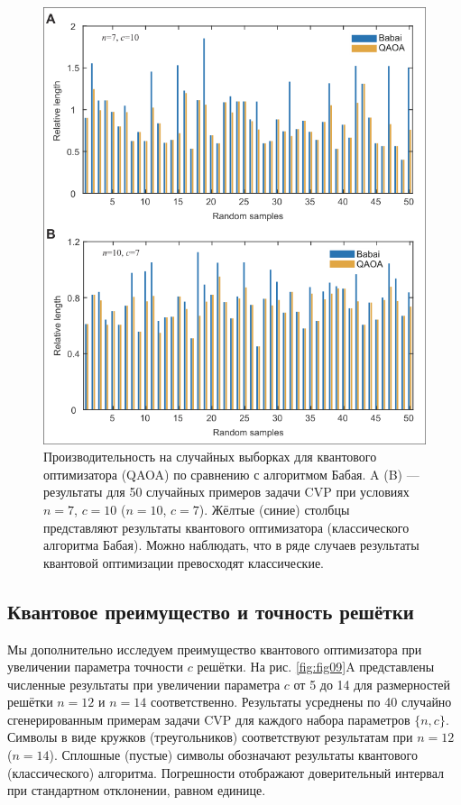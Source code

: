 \begin{figure}
    \centering
    \includegraphics[scale=0.6]{inc/fig_08.png}
    \caption{
    Производительность на случайных выборках для квантового оптимизатора (QAOA)
    по сравнению с алгоритмом Бабая. A (B) — результаты для 50 случайных
    примеров задачи CVP при условиях $n = 7$, $c = 10$ ($n = 10$, $c = 7$).
    Жёлтые (синие) столбцы представляют результаты квантового оптимизатора
    (классического алгоритма Бабая). Можно наблюдать, что в ряде случаев
    результаты квантовой оптимизации превосходят классические.
    }
    \label{fig:fig08}
\end{figure}

\subsection*{Квантовое преимущество и точность решётки}

Мы дополнительно исследуем преимущество квантового оптимизатора при увеличении
параметра точности $c$ решётки. На рис. \ref{fig:fig09}A представлены численные
результаты при увеличении параметра $c$ от 5 до 14 для размерностей решётки $n
= 12$ и $n = 14$ соответственно. Результаты усреднены по 40 случайно
сгенерированным примерам задачи CVP для каждого набора параметров $\{n, c\}$.
Символы в виде кружков (треугольников) соответствуют результатам при $n = 12$
($n = 14$). Сплошные (пустые) символы обозначают результаты квантового
(классического) алгоритма. Погрешности отображают доверительный интервал при
стандартном отклонении, равном единице.

